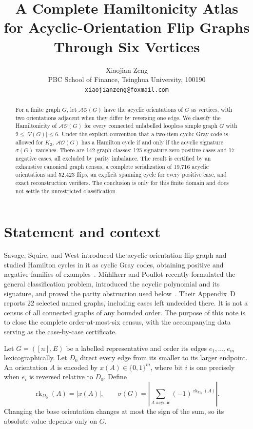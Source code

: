 \documentclass[11pt]{article}
\title{A Complete Hamiltonicity Atlas for Acyclic-Orientation Flip Graphs\\
Through Six Vertices}
\author{Xiaojian Zeng\\
PBC School of Finance, Tsinghua University, 100190\\
\texttt{xiaojianzeng@foxmail.com}}
\date{}
\newcommand{\AO}{\mathcal{AO}}
\begin{document}
\maketitle

\begin{abstract}
For a finite graph $G$, let $\AO(G)$ have the acyclic orientations of $G$ as
vertices, with two orientations adjacent when they differ by reversing one
edge.  We classify the Hamiltonicity of $\AO(G)$ for every connected
unlabelled loopless simple graph $G$ with $2\leq |V(G)|\leq 6$.  Under the
explicit convention that a two-item cyclic Gray code is allowed for $K_2$,
$\AO(G)$ has a Hamilton cycle if and only if the acyclic signature $\sigma(G)$
vanishes.  There are 142 graph classes: 125 signature-zero positive cases and
17 negative cases, all excluded by parity imbalance.  The result is certified
by an exhaustive canonical graph census, a complete serialization of 19,716
acyclic orientations and 52,423 flips, an explicit spanning cycle for every
positive case, and exact reconstruction verifiers.  The conclusion is only
for this finite domain and does not settle the unrestricted classification.
\end{abstract}

\section{Statement and context}

Savage, Squire, and West introduced the acyclic-orientation flip graph and
studied Hamilton cycles in it as cyclic Gray codes, obtaining positive and
negative families of examples~\cite{SavageSquireWest1993}.  M\"uhlherr and
Poullot recently formulated the general classification problem, introduced
the acyclic polynomial and its signature, and proved the parity obstruction
used below~\cite{MuehlherrPoullot2026}.  Their Appendix~D reports 22 selected
named graphs, including cases left undecided there.  It is not a census of all
connected graphs of any bounded order.  The purpose of this note is to close
the complete order-at-most-six census, with the accompanying data serving as
the case-by-case certificate.

Let $G=([n],E)$ be a labelled representative and order its edges
$e_1,\ldots,e_m$ lexicographically.  Let $D_0$ direct every edge from its
smaller to its larger endpoint.  An orientation $A$ is encoded by
$x(A)\in\{0,1\}^m$, where bit $i$ is one precisely when $e_i$ is reversed
relative to $D_0$.  Define
\[
 \operatorname{rk}_{D_0}(A)=|x(A)|,
 \qquad
 \sigma(G)=\left|\sum_{A\text{ acyclic}}
          (-1)^{\operatorname{rk}_{D_0}(A)}\right|.
\]
Changing the base orientation changes at most the sign of the sum, so its
absolute value depends only on $G$.
\end{document}
